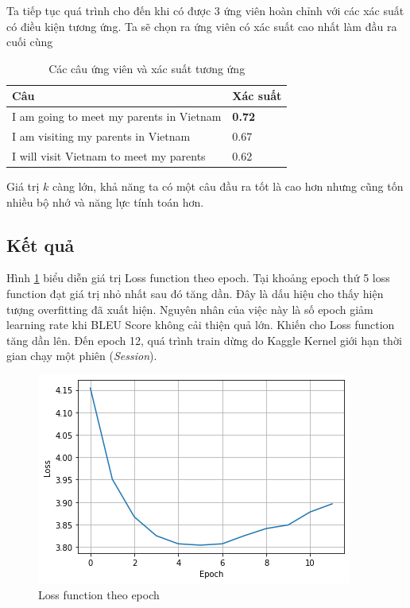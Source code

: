 \documentclass[14pt, a4paper]{article}
\numberwithin{equation}{section}
\numberwithin{algorithm}{section}
\numberwithin{figure}{section}
\numberwithin{table}{section}
\numberwithin{dl}{section}
\numberwithin{md}{section}
\numberwithin{bd}{section}
\numberwithin{dn}{section}
\numberwithin{hq}{section}
\begin{document}
\begin{enumerate} [label=(\alph*)]
\begin{figure}[h!]
        \end{figure}

        Ta tiếp tục quá trình cho đến khi có được 3 ứng viên hoàn chỉnh với các xác suất có điều kiện tương ứng.
        Ta sẽ chọn ra ứng viên có xác suất cao nhất làm đầu ra cuối cùng

        \begin{table}[h!]
            \centering\begin{tabular}{|l|l|}
            \hline
            Câu & Xác suất \\ \hline
            I am going to meet my parents in Vietnam & \textbf{0.72} \\ \hline
            I am visiting my parents in Vietnam & 0.67 \\ \hline
            I will visit Vietnam to meet my parents & 0.62 \\ \hline
            \end{tabular}
            \caption{Các câu ứng viên và xác suất tương ứng}
        \end{table}

        Giá trị $k$ càng lớn, khả năng ta có một câu đầu ra tốt là cao hơn nhưng cũng tốn nhiều bộ nhớ và năng lực tính toán hơn.

    \end{enumerate}

    \subsection{Kết quả}

    Hình \ref{fig:Loss} biểu diễn giá trị Loss function theo epoch.
    Tại khoảng epoch thứ 5 loss function đạt giá trị nhỏ nhất sau đó tăng dần.
    Đây là dấu hiệu cho thấy hiện tượng overfitting đã xuất hiện.
    Nguyên nhân của việc này là số epoch giảm learning rate khi BLEU Score không cải thiện quả lớn.
    Khiến cho Loss function tăng dần lên. Đến epoch 12, quá trình train dừng do Kaggle Kernel giới hạn thời gian chạy một phiên (\textit{Session}).

    \begin{figure}[h!] \centering

        \includegraphics[scale=0.6]{Loss.png}
        \caption{Loss function theo epoch}
        \label{fig:Loss}

    \end{figure}
\end{document}
